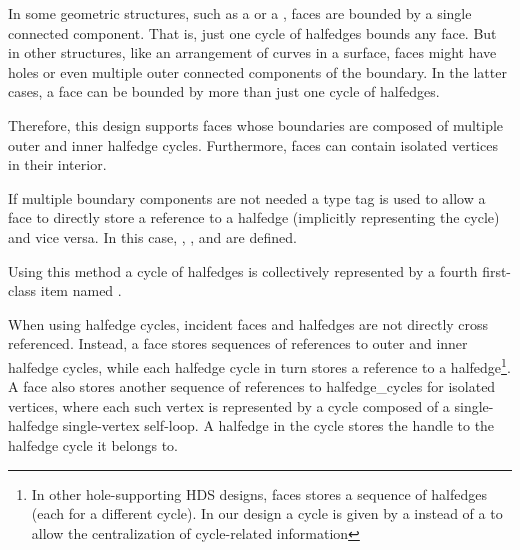 
{\XHDS
In some geometric structures, such as a  or a ,
faces are bounded by a single connected component. That is, just one cycle of halfedges bounds
any face. But in other structures, like an arrangement of curves in a surface, faces
might have holes or even multiple outer connected components of the boundary. 
In the latter cases, a face can be bounded by more than just one cycle of halfedges. 

Therefore, this design supports faces
whose boundaries are composed of multiple outer and inner halfedge cycles. Furthermore, faces can contain isolated vertices in their interior.




If multiple boundary components are not needed a type tag is used to allow a face to directly store 
a reference to a halfedge (implicitly representing the cycle) and vice versa. In this case, , ,  
and  are defined.


Using this method a cycle of halfedges is collectively represented 
by a fourth first-class  item named .

When using halfedge cycles, incident faces and halfedges are not directly cross referenced.
Instead, a face stores sequences of references to outer and inner halfedge cycles, while each 
halfedge cycle in turn stores a reference to a halfedge\footnote{In other
hole-supporting HDS designs, faces stores a sequence of halfedges (each for a different cycle).
In our design a cycle is given by a  instead of a  to allow 
the centralization of cycle-related information}. 
A face also stores another sequence of references to halfedge\_cycles for isolated vertices, where
each such vertex is represented by a cycle composed of a single-halfedge single-vertex self-loop.
A halfedge in the cycle stores the handle to the halfedge cycle it belongs to.

}
